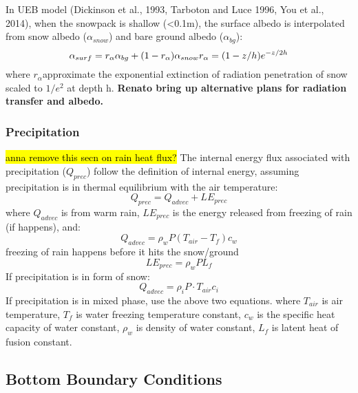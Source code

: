 \documentclass{article}
\begin{document}
In UEB model (Dickinson et al., 1993, Tarboton and Luce 1996, You et al., 2014), when the snowpack is shallow (<0.1m), the surface albedo is interpolated from snow albedo ($\alpha_{snow}$) and bare ground albedo ($\alpha_{bg}$):
\begin{equation}
\alpha_{surf} = r_\alpha\alpha_{bg}+(1-r_\alpha)\alpha_{snow}\\
r_\alpha = (1-z/h)e^{-z/2h}
\end{equation}where $r_\alpha$approximate the exponential extinction of radiation penetration of snow scaled to $1/e^2$
at depth h.
\textbf{Renato bring up alternative plans for radiation transfer and albedo.}

\subsubsection{Precipitation}
\hl{anna remove this secn on rain heat flux?}
The internal energy flux associated with precipitation ($Q_{prec}$) follow the definition of internal energy, assuming precipitation is in thermal equilibrium with the air temperature:
\begin{equation}
Q_{prec} = Q_{advec} + LE_{prec}        
\end{equation}
where $Q_{advec}$ is from warm rain,  $LE_{prec}$ is the energy released from freezing of rain (if happens), and:
\begin{equation}
Q_{advec}=\rho_wP (T_{air}-T_f)c_w 
\end{equation}
freezing of rain happens before it hits the snow/ground
\begin{equation}
LE_{prec}=\rho_wP L_f    
\end{equation}
If precipitation is in form of snow:
\begin{equation}
Q_{advec}=\rho_iP \cdot T_{air}c_i 
\end{equation}
If precipitation is in mixed phase, use the above two equations.
where $T_{air}$ is air temperature, $T_f$ is water freezing temperature constant, $c_w$ is the specific heat capacity of water constant, $\rho_w$ is density of water constant, $L_f$ is latent heat of fusion constant.


\subsection{Bottom Boundary Conditions}
\end{document}
